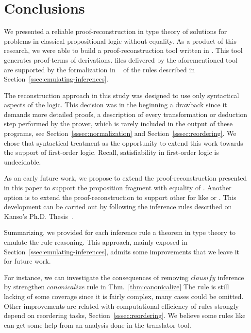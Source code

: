 \documentclass[../main.tex]{subfiles}
\begin{document}

\section{Conclusions}
\label{sec:conclusions}

We presented a reliable proof-reconstruction in type theory of \Metis
solutions for problems in classical propositional logic without
equality. As a product of this research, we were able to build a
proof-reconstruction tool written in \Haskell. This tool generates
\Agda proof-terms of \Metis \TSTP derivations. \Agda files
delivered by the aforementioned tool are supported by the
formalization in \Agda~\cite{AgdaProp,AgdaMetis} of the \Metis rules
described in Section~\ref{ssec:emulating-inferences}.

The reconstruction approach in this study was designed to use
only syntactical aspects of the logic.
This decision was in the beginning a drawback
since it demands more detailed proofs, a
description of every transformation or deduction step performed by
the prover, which is rarely included in the output of these programs,
see Section~\ref{sssec:normalization} and Section~\ref{sssec:reordering}.
We chose that syntactical treatment as the opportunity
to extend this work towards the support of first-order logic.
Recall, satisfiability in first-order logic is undecidable.

As an early future work, we propose to extend the
proof-reconstruction presented in this paper to support the
proposition fragment with equality of \Metis.
Another option is to extend the proof-reconstruction to support other \ATPs
for \CPL like  or .
This development can be carried out by following the 
inference rules described on Kanso's Ph.D. Thesis~\cite{Kanso2012}.

Summarizing, we provided for each \Metis inference rule a theorem in
type theory to emulate the rule reasoning. This approach, mainly
exposed in Section~\ref{ssec:emulating-inferences},
admits some improvements that we leave it for future work. 

For instance, we can investigate the consequences of removing $clausify$ inference by strengthen $canonicalize$ rule in Thm.~\ref{thm:canonicalize}
The \simplify rule is still lacking of some coverage since it is fairly complex, many cases could be omitted.
Other improvements are related with computational efficiency of
rules strongly depend on reordering tasks,
Section~\ref{sssec:reordering}.
We believe some rules like \canonicalize can get some help from an analysis done in the translator tool.
\end{document}
